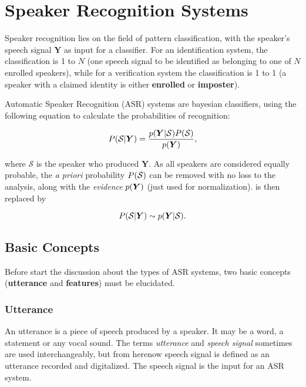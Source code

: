 \chapter{Speaker Recognition Systems}
\label{ch:speaker-recognition-systems}

Speaker recognition lies on the field of pattern classification, with the speaker's speech signal $\boldsymbol{Y}$ as input for a classifier. For an identification system, the classification is 1 to $N$ (one speech signal to be identified as belonging to one of $N$ enrolled speakers), while for a verification system the classification is 1 to 1 (a speaker with a claimed identity is either \textbf{enrolled} or \textbf{imposter}).

Automatic Speaker Recognition (ASR) systems are bayesian classifiers, using the following equation to calculate the probabilities of recognition:

\begin{equation}
    \postprob{\mathcal{S}}{\boldsymbol{Y}} = \frac{\postpdf{\boldsymbol{Y}}{\mathcal{S}} \prob{\mathcal{S}}}{\pdf{\boldsymbol{Y}}},
    \label{eq:bayes_equation}
\end{equation}

\noindent where $\mathcal{S}$ is the speaker who produced $\boldsymbol{Y}$. As all speakers are considered equally probable, the \emph{a priori} probability $P(\mathcal{S})$ can be removed with no loss to the analysis, along with the \emph{evidence} $p(\boldsymbol{Y})$ (just used for normalization).  is then replaced by

\begin{equation}
    \postprob{\mathcal{S}}{\boldsymbol{Y}} \sim \postpdf{\boldsymbol{Y}}{\mathcal{S}}.
    \label{eq:bayes_equation_simplified}
\end{equation}

\section{Basic Concepts}
\label{sec:basic-concepts}

Before start the discussion about the types of ASR systems, two basic concepts (\textbf{utterance} and \textbf{features}) must be elucidated.

\subsection{Utterance}

An utterance is a piece of speech produced by a speaker. It may be a word, a statement or any vocal sound. The terms \emph{utterance} and \emph{speech signal} sometimes are used interchangeably, but from herenow speech signal is defined as an utterance recorded and digitalized. The speech signal is the input for an ASR system.

